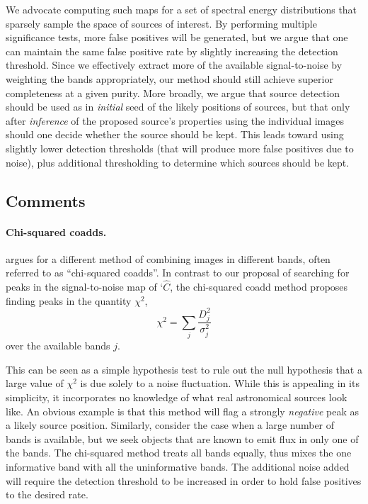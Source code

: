\documentclass[letterpaper,preprint]{aastex}
\begin{document}
We advocate computing such maps for a set of spectral energy
distributions that sparsely sample the space of sources of interest.
By performing multiple significance tests, more false positives will
be generated, but we argue that one can maintain the same false
positive rate by slightly increasing the detection threshold.  Since
we effectively extract more of the available signal-to-noise by
weighting the bands appropriately, our method should still achieve
superior completeness at a given purity.
%
More broadly, we argue that source detection should be used as in
\emph{initial} seed of the likely positions of sources, but that only
after \emph{inference} of the proposed source's properties using the
individual images should one decide whether the source should be kept.
This leads toward using slightly lower detection thresholds (that will
produce more false positives due to noise), plus additional
thresholding to determine which sources should be kept.


\subsection{Comments}

\paragraph{Chi-squared coadds.}
\cite{szalay} argues for a different method of combining images in
different bands, often referred to as ``chi-squared coadds''.  In
contrast to our proposal of searching for peaks in the signal-to-noise
map of `$\hat{C}$, the chi-squared coadd method proposes finding peaks
in the quantity $\chi^2$,
\begin{equation}
  \chi^2 = \sum_j \frac{D_j^2}{\sigma_j^2}
\end{equation}
over the available bands $j$.

This can be seen as a simple hypothesis test to rule out the null
hypothesis that a large value of $\chi^2$ is due solely to a noise
fluctuation.  While this is appealing in its simplicity, it
incorporates no knowledge of what real astronomical sources look like.
An obvious example is that this method will flag a strongly
\emph{negative} peak as a likely source position.  Similarly, consider
the case when a large number of bands is available, but we seek
objects that are known to emit flux in only one of the bands.  The
chi-squared method treats all bands equally, thus mixes the one
informative band with all the uninformative bands.  The additional
noise added will require the detection threshold to be increased in
order to hold false positives to the desired rate.
\end{document}
